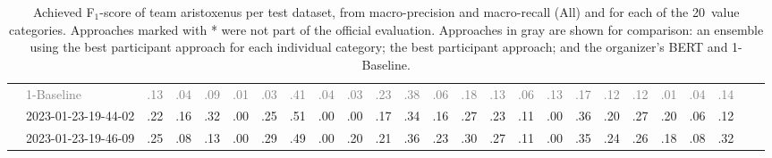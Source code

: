 \begin{table*}
\begin{tabular}{@{}ll@{\hspace{10pt}}c@{\hspace{5pt}}cccccccccccccccccccccc@{}}
& \textcolor{gray}{1-Baseline} & \textcolor{gray}{.13} & \textcolor{gray}{.04} & \textcolor{gray}{.09} & \textcolor{gray}{.01} & \textcolor{gray}{.03} & \textcolor{gray}{.41} & \textcolor{gray}{.04} & \textcolor{gray}{.03} & \textcolor{gray}{.23} & \textcolor{gray}{.38} & \textcolor{gray}{.06} & \textcolor{gray}{.18} & \textcolor{gray}{.13} & \textcolor{gray}{.06} & \textcolor{gray}{.13} & \textcolor{gray}{.17} & \textcolor{gray}{.12} & \textcolor{gray}{.12} & \textcolor{gray}{.01} & \textcolor{gray}{.04} & \textcolor{gray}{.14} \\
& 2023-01-23-19-44-02 & .22 & .16 & .32 & .00 & .25 & .51 & .00 & .00 & .17 & .34 & .16 & .27 & .23 & .11 & .00 & .36 & .20 & .27 & .20 & .06 & .12 \\
& 2023-01-23-19-46-09 & .25 & .08 & .13 & .00 & .29 & .49 & .00 & .20 & .21 & .36 & .23 & .30 & .27 & .11 & .00 & .35 & .24 & .26 & .18 & .08 & .32 \\
\bottomrule
\end{tabular}
\caption{Achieved F$_1$-score of team aristoxenus per test dataset, from macro-precision and macro-recall (All) and for each of the 20~value categories. Approaches marked with * were not part of the official evaluation. Approaches in gray are shown for comparison: an ensemble using the best participant approach for each individual category; the best participant approach; and the organizer's BERT and 1-Baseline.}
\label{table-results}
\end{table*}

